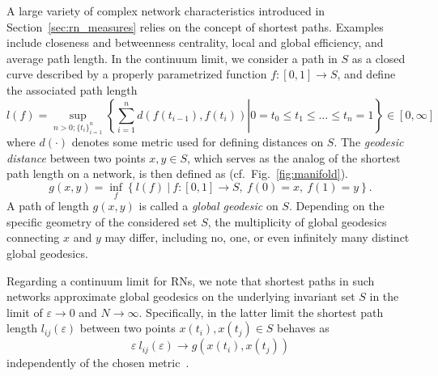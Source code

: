 A large variety of complex network characteristics introduced in Section~\ref{sec:rn_measures} relies on the concept of shortest paths. Examples include closeness and betweenness centrality, local and global efficiency, and average path length. In the continuum limit, we consider a path in $S$ as a closed curve described by a properly parametrized function $f:[0,1]\to S$, and define the associated path length 
\begin{equation}
l(f) = \sup_{n>0; \{t_i\}_{i=1}^n} \left.\left\{ \sum_{i=1}^n d(f(t_{i-1}),f(t_i)) \right| 0=t_0\leq t_1\leq\dots\leq t_n=1 \right\} \in[0,\infty] 
\end{equation}
\noindent
where $d(\cdot)$ denotes some metric used for defining distances on $S$. The \textit{geodesic distance} between two points $x,y\in S$, which serves as the analog of the shortest path length on a network, is then defined as (cf.~Fig.~\ref{fig:manifold}).
\begin{equation}
g(x,y) = \inf_f \left\{ l(f)\ |\ f:[0,1]\to S,\ f(0)=x,\ f(1)=y \right\}.
\end{equation}
\noindent
A path of length $g(x,y)$ is called a \emph{global geodesic} on $S$. Depending on the specific geometry of the considered set $S$, the multiplicity of global geodesics connecting $x$ and $y$ may differ, including no, one, or even infinitely many distinct global geodesics.

Regarding a continuum limit for RNs, we note that shortest paths in such networks approximate global geodesics on the underlying invariant set $S$ in the limit of $\varepsilon\to 0$ and $N\to\infty$. Specifically, in the latter limit the shortest path length $l_{ij}(\varepsilon)$ between two points $x(t_i), x(t_j)\in S$ behaves as
\begin{equation}
\varepsilon\ l_{ij}(\varepsilon) \to g(x(t_i),x(t_j))
\end{equation}
\noindent 
independently of the chosen metric~\cite{Donges2012}.

